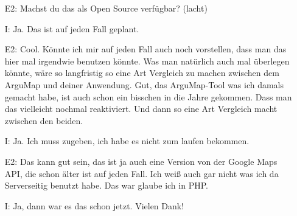 \begin{itemize}
    \item[E2:] Machst du das als Open Source verf{\"u}gbar? (lacht)
    \item[I:] Ja. Das ist auf jeden Fall geplant.
    \item[E2:] Cool. K{\"o}nnte ich mir auf jeden Fall auch noch vorstellen, dass man das hier mal irgendwie benutzen k{\"o}nnte. Was man nat{\"u}rlich auch mal {\"u}berlegen k{\"o}nnte, w{\"a}re so langfristig so eine Art Vergleich zu machen zwischen dem ArguMap und deiner Anwendung. Gut, das ArguMap-Tool was ich damals gemacht habe, ist auch schon ein bisschen in die Jahre gekommen. Dass man das vielleicht nochmal reaktiviert. Und dann so eine Art Vergleich macht zwischen den beiden.
    \item[I:] Ja. Ich muss zugeben, ich habe es nicht zum laufen bekommen.
    \item[E2:] Das kann gut sein, das ist ja auch eine Version von der Google Maps API, die schon {\"a}lter ist auf jeden Fall. Ich wei{\ss} auch gar nicht was ich da Serverseitig benutzt habe. Das war glaube ich in PHP.
    \item[I:] Ja, dann war es das schon jetzt. Vielen Dank!        
\end{itemize}